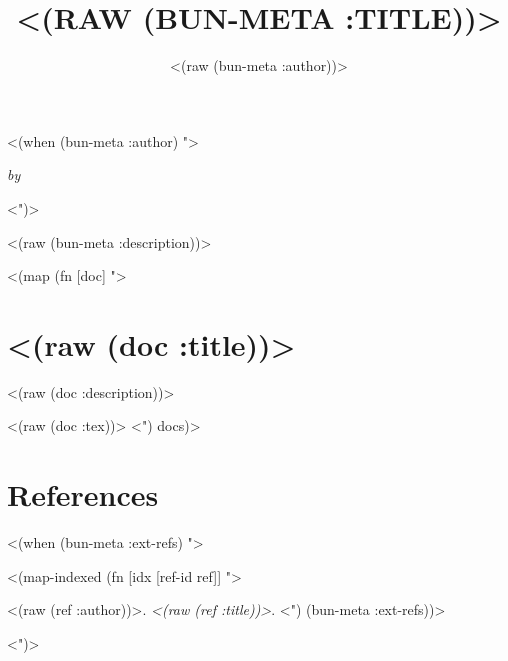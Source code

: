 \documentclass[a4paper,10pt]{article}
\author{<(raw (bun-meta :author))>}
\title{\uppercase{<(raw (bun-meta :title))>}}
\makeatletter
\def\maketitle{%
  \thispagestyle{empty}%
  \vskip 1cm
  \begin{center}
    \Large \strut \@title \par
  \end{center}
  \par
  <(when (bun-meta :author) ">
  \begin{center}
    \emph{by } \normalfont\@author\par
  \end{center}
  <")>
  }
\makeatother
\begin{document}
\maketitle

<(raw (bun-meta :description))>

<(map (fn [doc] ">
\section{<(raw (doc :title))>}

<(raw (doc :description))>

<(raw (doc :tex))>
<") docs)>

\section*{References}

<(when (bun-meta :ext-refs) ">
\begin{description}[leftmargin=3cm,style=nextline]
<(map-indexed
 (fn [idx [ref-id ref]] ">
\item[<(raw ref-id)>] <(raw (ref :author))>. \emph{<(raw (ref :title))>}.
<") (bun-meta :ext-refs))>
\end{description}
<")>
\end{document}
